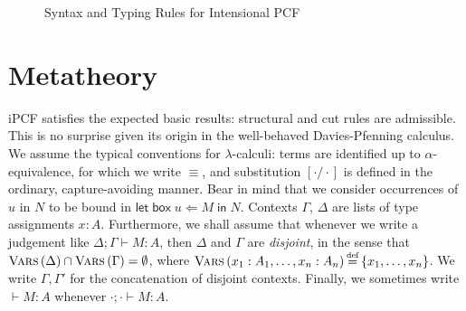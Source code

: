 \documentclass[11pt]{entcs}
\newcommand{\defeq}{\stackrel{\mathclap{\mbox{\tiny def}}}{=}}
\newcommand{\ctxt}[2]{#1\mathbin{;}#2}
\newcommand{\letbox}[3]{\mathsf{let\;box\;} #1 \Leftarrow #2 \mathsf{\;in\;} #3}
\newcommand{\vars}[1]{\textsc{Vars}\left(#1\right)}
\begin{document}
\begin{figure}
  \caption{Syntax and Typing Rules for Intensional PCF}
  \label{fig:ipcf}
  \begin{framed}
    
  \end{framed}
\end{figure}

\section{Metatheory}
  \label{sec:ipcfmeta}

iPCF satisfies the expected basic results: structural and cut
rules are admissible. This is no surprise given its origin in the
well-behaved Davies-Pfenning calculus. We assume the typical
conventions for $\lambda$-calculi: terms are identified up to
$\alpha$-equivalence, for which we write $\equiv$, and
substitution $[\cdot / \cdot]$ is defined in the ordinary,
capture-avoiding manner. Bear in mind that we consider occurrences
of $u$ in $N$ to be bound in $\letbox{u}{M}{N}$.  Contexts
$\Gamma$, $\Delta$ are lists of type assignments $x : A$.
Furthermore, we shall assume that whenever we write a judgement
like $\ctxt{\Delta}{\Gamma} \vdash M : A$, then $\Delta$ and
$\Gamma$ are \emph{disjoint}, in the sense that $\vars{\Delta}
\cap \vars{\Gamma} = \emptyset$, where $\vars{x_1 : A_1, \dots,
x_n : A_n} \defeq \{x_1, \dots, x_n\}$.  We write $\Gamma, \Gamma'$
for the concatenation of disjoint contexts. Finally, we sometimes
write $\vdash M : A$ whenever $\ctxt{\cdot}{\cdot} \vdash M : A$.
\end{document}
